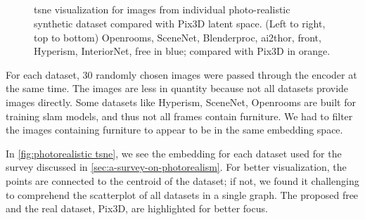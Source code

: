 \begin{figure}[!ht]
    \centering
    \resizebox{0.49\linewidth}{5cm}{}
    \resizebox{0.49\linewidth}{5cm}{}\\
    \resizebox{0.49\linewidth}{5cm}{}
    \resizebox{0.49\linewidth}{5cm}{}\\
    \resizebox{0.49\linewidth}{5cm}{}
    \resizebox{0.49\linewidth}{5cm}{}\\
    \resizebox{0.49\linewidth}{5cm}{}
    \resizebox{0.49\linewidth}{5cm}{}\\
    \caption[\gls{tsne} comparison for Real and Synthetic Dataset.]{\gls{tsne} visualization for images from individual photo-realistic synthetic dataset compared with Pix3D latent space.
        (Left to right, top to bottom) Openrooms, SceneNet, Blenderproc, \gls{ai2thor}, \gls{front}, Hyperism, InteriorNet, \gls{free} in blue;
        compared with Pix3D in orange.}
    \label{fig:tsne per dataset}
\end{figure}

For each dataset, 30 randomly chosen images were passed through the encoder at the same time.
The images are less in quantity because not all datasets provide images directly.
Some datasets like Hyperism, SceneNet, Openrooms are built for training \gls{slam} models, and thus not all frames contain furniture.
We had to filter the images containing furniture to appear to be in the same embedding space.

In \autoref{fig:photorealistic tsne}, we see the embedding for each dataset used for the survey discussed in \autoref{sec:a-survey-on-photorealism}.
For better visualization, the points are connected to the centroid of the dataset;
if not, we found it challenging to comprehend the scatterplot of all datasets in a single graph.
The proposed \gls{free} and the real dataset, Pix3D, are highlighted for better focus.

